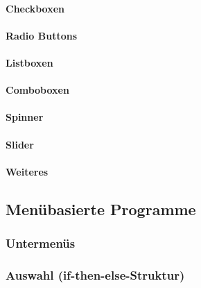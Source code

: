 \documentclass[a4paper, 11pt, accentcolor = tud3b]{tudreport}
\begin{document}
					\paragraph{Checkboxen} %

					\paragraph{Radio Buttons} %

					\paragraph{Listboxen} %

					\paragraph{Comboboxen} %

					\paragraph{Spinner} %

					\paragraph{Slider} %

					\paragraph{Weiteres} %

			\subsection{Menübasierte Programme} %

				\subsubsection{Untermenüs} %

				\subsubsection{Auswahl (if-then-else-Struktur)} %
\end{document}

